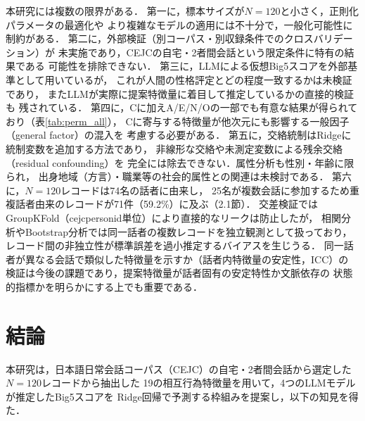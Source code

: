 \documentclass[dvipdfmx,11pt,a4paper]{bxjsarticle}
\renewcommand{\_}{\paperorigunderscore\allowbreak}%
\begin{document}
本研究には複数の限界がある．
第一に，標本サイズが$N = 120$と小さく，正則化パラメータの最適化や
より複雑なモデルの適用には不十分で，一般化可能性に制約がある．
第二に，外部検証（別コーパス・別収録条件でのクロスバリデーション）が
未実施であり，CEJCの自宅・2者間会話という限定条件に特有の結果である
可能性を排除できない．
第三に，LLMによる仮想Big5スコアを外部基準として用いているが，
これが人間の性格評定とどの程度一致するかは未検証であり，
またLLMが実際に提案特徴量に着目して推定しているかの直接的検証も
残されている．
第四に，Cに加えA/E/N/Oの一部でも有意な結果が得られており（表\ref{tab:perm_all}），
Cに寄与する特徴量が他次元にも影響する一般因子（general factor）の混入を
考慮する必要がある．
第五に，交絡統制はRidgeに統制変数を追加する方法であり，
非線形な交絡や未測定変数による残余交絡（residual confounding）を
完全には除去できない．属性分析も性別・年齢に限られ，
出身地域（方言）・職業等の社会的属性との関連は未検討である．
第六に，$N = 120$レコードは74名の話者に由来し，
25名が複数会話に参加するため重複話者由来のレコードが71件（59.2\%）に及ぶ（2.1節）．
交差検証ではGroupKFold（cejc\_person\_id単位）により直接的なリークは防止したが，
相関分析やBootstrap分析では同一話者の複数レコードを独立観測として扱っており，
レコード間の非独立性が標準誤差を過小推定するバイアスを生じうる．
同一話者が異なる会話で類似した特徴量を示すか（話者内特徴量の安定性，ICC）の
検証は今後の課題であり，提案特徴量が話者固有の安定特性か文脈依存の
状態的指標かを明らかにする上でも重要である．

\section{結論}

本研究は，日本語日常会話コーパス（CEJC）の自宅・2者間会話から選定した$N = 120$レコードから抽出した
19の相互行為特徴量を用いて，4つのLLMモデルが推定したBig5スコアを
Ridge回帰で予測する枠組みを提案し，以下の知見を得た．
\end{document}
